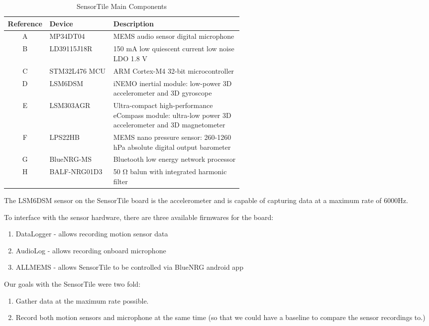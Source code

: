 \begin{table}[H]
\centering
\begin{tabular}{@{}|c|l|p{0.55\linewidth}|@{}}
\hline
\toprule
{\bf Reference} & {\bf Device} & {\bf Description} \\ \hline
\midrule
A & MP34DT04      & MEMS audio sensor digital microphone \\ \hline
B & LD39115J18R   & 150 mA low quiescent current low noise LDO 1.8 V \\ \hline
C & STM32L476 MCU & ARM Cortex-M4 32-bit microcontroller \\ \hline
D & LSM6DSM       & iNEMO inertial module: low-power 3D accelerometer and 3D gyroscope \\ \hline
E & LSM303AGR     & Ultra-compact high-performance eCompass module: ultra-low power 3D accelerometer and 3D magnetometer \\ \hline
F & LPS22HB       & MEMS nano pressure sensor: 260-1260 hPa absolute digital output barometer \\ \hline
G & BlueNRG-MS    & Bluetooth low energy network processor \\ \hline
H & BALF-NRG01D3  & 50 Ω balun with integrated harmonic filter \\ \hline
\bottomrule
\end{tabular}
\caption{SensorTile Main Components}
\label{table:sensortile}
\end{table}

\newpage

The LSM6DSM sensor on the SensorTile board is the accelerometer and is capable of capturing data at a maximum rate of 6000Hz.

To interface with the sensor hardware, there are three available firmwares for the board:

\begin{enumerate}
    \item DataLogger - allows recording motion sensor data
    \item AudioLog - allows recording onboard microphone
    \item ALLMEMS - allows SensorTile to be controlled via BlueNRG android app
\end{enumerate}

Our goals with the SensorTile were two fold:

\begin{enumerate}
\item Gather data at the maximum rate possible.
\item Record both motion sensors and microphone at the same time (so that we could have a baseline to compare the sensor recordings to.)
\end{enumerate}

